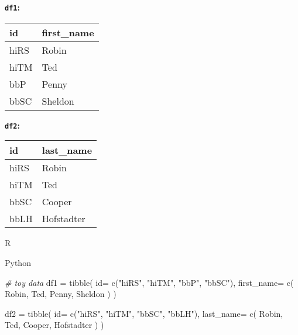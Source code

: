 \documentclass[
]{book}
\newenvironment{Shaded}{\begin{snugshade}}{\end{snugshade}}
\newcommand{\CommentTok}[1]{\textcolor[rgb]{0.56,0.35,0.01}{\textit{#1}}}
\newcommand{\FunctionTok}[1]{\textcolor[rgb]{0.00,0.00,0.00}{#1}}
\newcommand{\NormalTok}[1]{#1}
\newcommand{\OtherTok}[1]{\textcolor[rgb]{0.56,0.35,0.01}{#1}}
\newcommand{\StringTok}[1]{\textcolor[rgb]{0.31,0.60,0.02}{#1}}
\begin{document}
\textbf{\texttt{df1}:}

\begin{longtable}[]{@{}ll@{}}
\toprule
id & first\_name \\
\midrule
\endhead
hiRS & Robin \\
hiTM & Ted \\
bbP & Penny \\
bbSC & Sheldon \\
\bottomrule
\end{longtable}

\textbf{\texttt{df2}:}

\begin{longtable}[]{@{}ll@{}}
\toprule
id & last\_name \\
\midrule
\endhead
hiRS & Robin \\
hiTM & Ted \\
bbSC & Cooper \\
bbLH & Hofstadter \\
\bottomrule
\end{longtable}

R

Python

\begin{Shaded}
\begin{Highlighting}[]
\CommentTok{\# toy data}
\NormalTok{df1 }\OtherTok{=} \FunctionTok{tibble}\NormalTok{(}
    \StringTok{\textquotesingle{}id\textquotesingle{}}\OtherTok{=} \FunctionTok{c}\NormalTok{(}\StringTok{"hiRS"}\NormalTok{, }\StringTok{"hiTM"}\NormalTok{,}
           \StringTok{"bbP"}\NormalTok{, }\StringTok{"bbSC"}\NormalTok{),}
    \StringTok{\textquotesingle{}first\_name\textquotesingle{}}\OtherTok{=} \FunctionTok{c}\NormalTok{(}
        \StringTok{\textquotesingle{}Robin\textquotesingle{}}\NormalTok{,}
        \StringTok{\textquotesingle{}Ted\textquotesingle{}}\NormalTok{,}
        \StringTok{\textquotesingle{}Penny\textquotesingle{}}\NormalTok{,}
        \StringTok{\textquotesingle{}Sheldon\textquotesingle{}}
\NormalTok{    )}
\NormalTok{)}



\NormalTok{df2 }\OtherTok{=} \FunctionTok{tibble}\NormalTok{(}
    \StringTok{\textquotesingle{}id\textquotesingle{}}\OtherTok{=} \FunctionTok{c}\NormalTok{(}\StringTok{"hiRS"}\NormalTok{, }\StringTok{"hiTM"}\NormalTok{,}
            \StringTok{"bbSC"}\NormalTok{, }\StringTok{"bbLH"}\NormalTok{),}
    \StringTok{\textquotesingle{}last\_name\textquotesingle{}}\OtherTok{=} \FunctionTok{c}\NormalTok{(}
        \StringTok{\textquotesingle{}Robin\textquotesingle{}}\NormalTok{,}
        \StringTok{\textquotesingle{}Ted\textquotesingle{}}\NormalTok{,}
        \StringTok{\textquotesingle{}Cooper\textquotesingle{}}\NormalTok{,}
        \StringTok{\textquotesingle{}Hofstadter\textquotesingle{}}
\NormalTok{    )}
\NormalTok{)}
\end{Highlighting}
\end{Shaded}
\end{document}
